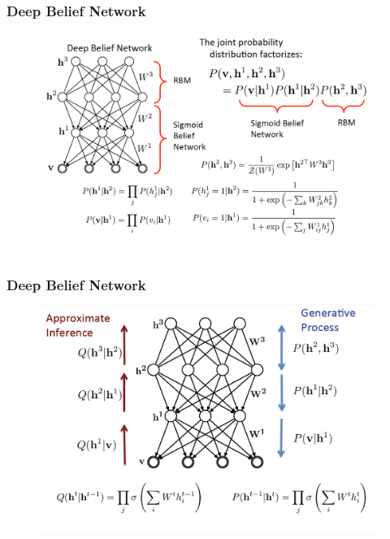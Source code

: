 \documentclass{beamer}
\begin{document}
\begin{frame}
\frametitle{Deep Belief Network}
\begin{figure}
      \includegraphics[width=1\textwidth]{figs/rbm26.png}
\end{figure}
\end{frame}

\begin{frame}
\frametitle{Deep Belief Network}
\begin{figure}
      \includegraphics[width=1\textwidth]{figs/rbm29.png}
\end{figure}
\end{frame}
\end{document}
